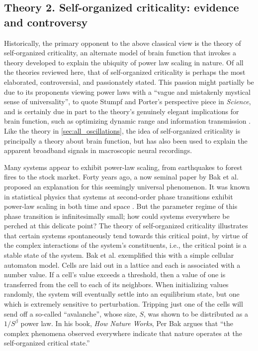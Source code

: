 \subsection{Theory 2. Self-organized criticality: evidence and controversy} \label{sec:SOC}

Historically, the primary opponent to the above classical view is the theory of self-organized criticality, an alternate model of brain function that invokes a theory developed to explain the ubiquity of power law scaling in nature. Of all the theories reviewed here, that of self-organized criticality is perhaps the most elaborated, controversial, and passionately stated. This passion might partially be due to its proponents viewing power laws with a ``vague and mistakenly mystical sense of universality'', to quote Stumpf and Porter’s perspective piece in \textit{Science}\cite{Stumpf2012}, and is certainly due in part to the theory’s genuinely elegant implications for brain function, such as optimizing dynamic range \cite{Kinouchi2006} and information transmission \cite{Shriki2016}. Like the theory in \autoref{sec:all_oscillations}, the idea of self-organized criticality is principally a theory about brain function, but has also been used to explain the apparent broadband signals in macroscopic neural recordings. 

Many systems appear to exhibit power-law scaling, from earthquakes to forest fires to the stock market. Forty years ago, a now seminal paper by Bak et al. \cite{Bak1987} proposed an explanation for this seemingly universal phenomenon. It was known in statistical physics that systems at second-order phase transitions exhibit power-law scaling in both time and space \cite{pathria2016statistical}. But the parameter regime of this phase transition is infinitesimally small; how could systems everywhere be perched at this delicate point? The theory of self-organized criticality illustrates that certain systems spontaneously tend towards this critical point, by virtue of the complex interactions of the system's constituents, i.e., the critical point is a stable state of the system. Bak et al. \cite{Bak1987} exemplified this with a simple cellular automaton model. Cells are laid out in a lattice and each is associated with a number value. If a cell’s value exceeds a threshold, then a value of one is transferred from the cell to each of its neighbors. When initializing values randomly, the system will eventually settle into an equilibrium state, but one which is extremely sensitive to perturbation. Tripping just one of the cells will send off a so-called ``avalanche'', whose size, $S$, was shown to be distributed as a $1/S^\beta$ power law. In his book, \textit{How Nature Works}\cite{Bak1996}, Per Bak argues that “the complex phenomena observed everywhere indicate that nature operates at the self-organized critical state.”

